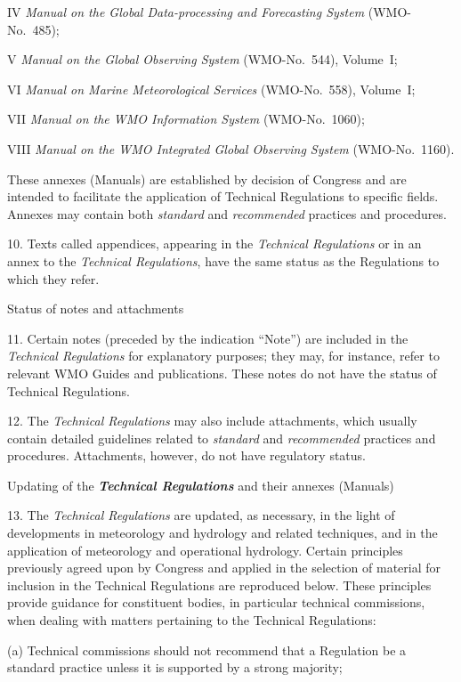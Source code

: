 IV \emph{Manual on the Global Data-processing and Forecasting System} (WMO-No.~485);

V \emph{Manual on the Global Observing System} (WMO-No.~544), Volume~I;

VI \emph{Manual on Marine Meteorological Services} (WMO-No.~558), Volume~I;

VII \emph{Manual on the WMO Information System} (WMO-No.~1060);

VIII \emph{Manual on the WMO Integrated Global Observing System} (WMO-No.~1160).

These annexes (Manuals) are established by decision of Congress and are intended to facilitate the application of Technical Regulations to specific fields. Annexes may contain both \emph{standard} and \emph{recommended} practices and procedures.

10. Texts called appendices, appearing in the \emph{Technical Regulations} or in an annex to the \emph{Technical Regulations}, have the same status as the Regulations to which they refer.

Status of notes and attachments

11. Certain notes (preceded by the indication ``Note'') are included in the \emph{Technical Regulations} for explanatory purposes; they may, for instance, refer to relevant WMO Guides and publications. These notes do not have the status of Technical Regulations.

12. The \emph{Technical Regulations} may also include attachments, which usually contain detailed guidelines related to \emph{standard} and \emph{recommended} practices and procedures. Attachments, however, do not have regulatory status.

Updating of the \emph{\textbf{Technical Regulations}} and their annexes (Manuals)

13. The \emph{Technical Regulations} are updated, as necessary, in the light of developments in meteorology and hydrology and related techniques, and in the application of meteorology and operational hydrology. Certain principles previously agreed upon by Congress and applied in the selection of material for inclusion in the Technical Regulations are reproduced below. These principles provide guidance for constituent bodies, in particular technical commissions, when dealing with matters pertaining to the Technical Regulations:

(a) Technical commissions should not recommend that a Regulation be a standard practice unless it is supported by a strong majority;

